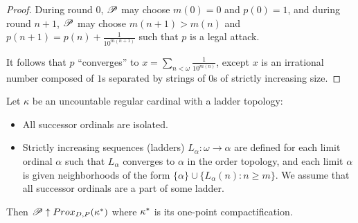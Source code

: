 \begin{proof}
  During round $0$, $\mathscr{P}$ may choose $m(0)=0$ and $p(0)=1$, 
  and during round $n+1$,
  $\mathscr{P}$ may choose $m(n+1)>m(n)$ and
  $p(n+1)=p(n)+\frac{1}{10^{m(n+1)}}$ such that $p$ is a legal attack.
  
  It follows that $p$ ``converges'' to 
  $x=\sum_{n<\omega}\frac{1}{10^{m(n)}}$, except $x$ is an irrational
  number composed of $1$s separated by strings of $0$s of strictly
  increasing size.
\end{proof}

\begin{example}
  Let $\kappa$ be an uncountable regular cardinal with a ladder 
  topology:
    \begin{itemize}
      \item All successor ordinals are isolated.
      \item Strictly increasing sequences (ladders) $L_\alpha:\omega\to\alpha$ 
            are defined for each limit ordinal $\alpha$ such that $L_\alpha$ converges to $\alpha$ in the order topology, and each limit
            $\alpha$ is given neighborhoods of the form
            $\{\alpha\}\cup\{L_\alpha(n):n\geq m\}$. We assume that
            all successor ordinals are a part of some ladder.
    \end{itemize} 
  Then $\mathscr{P}\uparrow Prox_{D,P}(\kappa^*)$ where $\kappa^*$
  is its one-point compactification.
\end{example}

